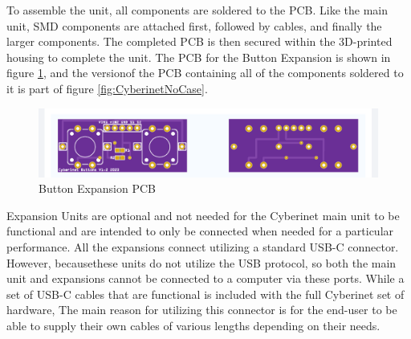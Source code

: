 To assemble the unit, all components are soldered to the PCB. Like the main unit, SMD components are attached first, followed by cables, and finally the larger components. The completed PCB is then secured within the 3D-printed housing to complete the unit. The PCB for the Button Expansion is shown in figure \ref{fig:buttonPCB}, and the versionof the PCB containing all of the components soldered to it is part of figure \ref{fig:CyberinetNoCase}.


\begin{center}
    \begin{figure}
        \centering
        \includegraphics[scale=0.5]{diagrams/PCBs/buttons1.2.png}
        \caption{Button Expansion PCB}
        \label{fig:buttonPCB}
    \end{figure}
\end{center}


Expansion Units are optional and not needed for the Cyberinet main unit to be functional and are intended to only be connected when needed for a particular performance. All the expansions connect utilizing a standard USB-C connector. However, becausethese units do not utilize the USB protocol, so both the main unit and expansions cannot be connected to a computer via these ports. While a set of USB-C cables that are functional is included with the full Cyberinet set of hardware, The main reason for utilizing this connector is for the end-user to be able to supply their own cables of various lengths depending on their needs. 


